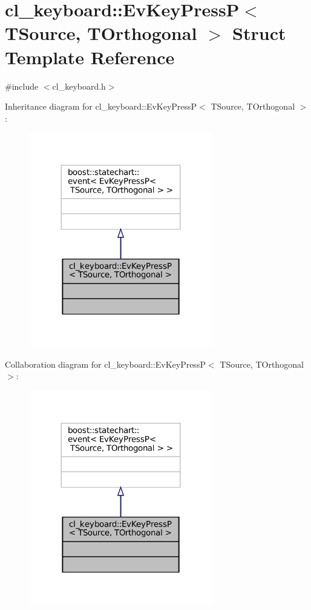 \hypertarget{structcl__keyboard_1_1EvKeyPressP}{}\section{cl\+\_\+keyboard\+:\+:Ev\+Key\+PressP$<$ T\+Source, T\+Orthogonal $>$ Struct Template Reference}
\label{structcl__keyboard_1_1EvKeyPressP}


{\ttfamily \#include $<$cl\+\_\+keyboard.\+h$>$}



Inheritance diagram for cl\+\_\+keyboard\+:\+:Ev\+Key\+PressP$<$ T\+Source, T\+Orthogonal $>$\+:
\nopagebreak
\begin{figure}[H]
\begin{center}
\leavevmode
\includegraphics[width=227pt]{structcl__keyboard_1_1EvKeyPressP__inherit__graph}
\end{center}
\end{figure}


Collaboration diagram for cl\+\_\+keyboard\+:\+:Ev\+Key\+PressP$<$ T\+Source, T\+Orthogonal $>$\+:
\nopagebreak
\begin{figure}[H]
\begin{center}
\leavevmode
\includegraphics[width=227pt]{structcl__keyboard_1_1EvKeyPressP__coll__graph}
\end{center}
\end{figure}


